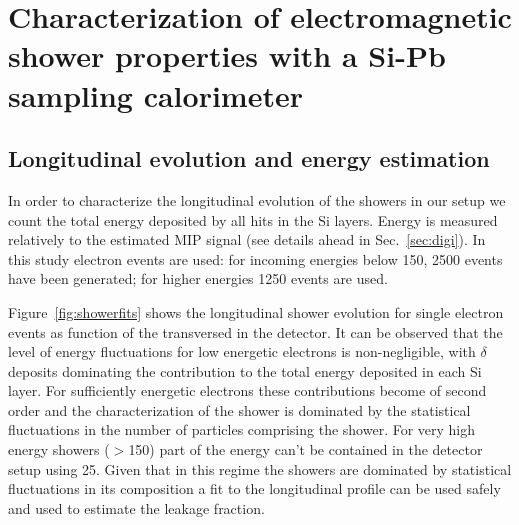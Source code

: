 %
%
%
\clearpage
\section{Characterization of electromagnetic shower properties with
a Si-Pb sampling calorimeter}
\label{sec:emshowerproperties}


\subsection{Longitudinal evolution and energy estimation}
\label{subsec:longevol}

In order to characterize the longitudinal evolution of the showers in
our setup we count the total energy deposited by all hits in the Si layers. 
Energy is measured relatively to the estimated MIP signal (see details
ahead in Sec.~\ref{sec:digi}).
In this study electron events are used: for incoming energies
below 150\GeV, 2500 events have been generated; for higher energies
1250 events are used.

Figure~\ref{fig:showerfits} shows the longitudinal shower evolution
for single electron events as function of the \Xnot transversed in the
detector.
It can be observed that the level of energy fluctuations for low
energetic electrons is non-negligible, with $\delta$ deposits
dominating the contribution to the total energy deposited in each Si
layer.
For sufficiently energetic electrons these contributions become of
second order and the characterization of the shower is dominated by
the statistical fluctuations in the number of particles comprising the shower.
For very high energy showers ($>$150\GeV) part of the energy can't be
contained in the detector setup using 25\Xnot. Given that in this
regime the showers are dominated by statistical fluctuations in its
composition a fit to the longitudinal profile can be used safely and
used to estimate the leakage fraction.

